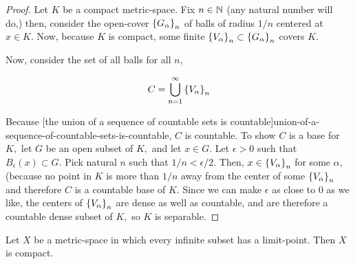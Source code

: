 \documentclass{article}
\begin{document}
\begin{proof}
Let $K$ be a \@{compact} \@{metric-space}. Fix $n \in \mathbb{N}$ (any natural number will do,) then, consider the \@{open-cover} $\left\{ G_\alpha \right\}_n$ of \@{balls} of radius $1/n$ centered at $x \in K.$ Now, because $K$ is compact, some finite $\left\{ V_\alpha \right\}_n \subset \left\{ G_\alpha \right\}_n$ covers $K.$

Now, consider the set of all balls for all $n,$

\[ C = \bigcup_{n=1}^{\infty} \left\{ V_\alpha \right\}_n \]

Because \@[the union of a sequence of countable sets is countable]{union-of-a-sequence-of-countable-sets-is-countable}, $C$ is countable. To show $C$ is a \@{base} for $K,$ let $G$ be an open subset of $K,$ and let $x \in G.$ Let $\epsilon > 0$ such that $B_{\epsilon}(x) \subset G.$ Pick natural $n$ such that $1/n < \epsilon/2.$ Then, $x \in \left\{ V_\alpha \right\}_n$ for some $\alpha,$ (because no point in $K$ is more than $1/n$ away from the center of some $\left\{ V_\alpha \right\}_n$ and therefore $C$ is a countable base of $K.$ Since we can make $\epsilon$ as close to $0$ as we like, the centers of $\left\{ V_\alpha \right\}_n$ are \@{dense} as well as countable, and are therefore a countable dense subset of $K,$ so $K$ is \@{separable}.
\end{proof}

\begin{theorem}\label{infinite-subset-has-limit-point-implies-compact}
Let $X$ be a \@{metric-space} in which every \@{infinite} subset has a \@{limit-point}. Then $X$ is \@{compact}.
\end{theorem}
\end{document}
